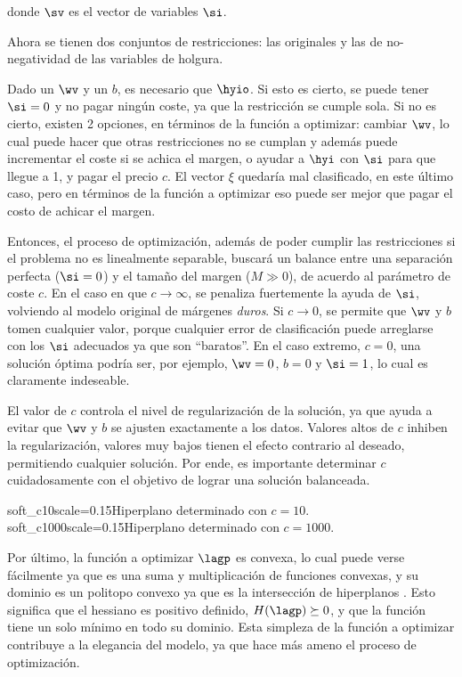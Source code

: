 donde $\sv$ es el vector de variables $\si$.

Ahora se tienen dos conjuntos de restricciones: las originales y las de no-negatividad de las variables de holgura.

Dado un $\wv$ y un $b$, es necesario que $\hyio$. Si esto es cierto, se puede tener $\si=0$ y no pagar ningún coste, ya que la restricción se cumple sola. Si no es cierto, existen 2 opciones, en términos de la función a optimizar:  cambiar $\wv$, lo cual puede hacer que otras restricciones no se cumplan y además puede incrementar el coste si se achica el margen, o ayudar a $\hyi$ con $\si$ para que llegue a 1, y pagar el precio $c$. El vector $\xi$ quedaría mal clasificado, en este último caso, pero en términos de la función a optimizar eso puede ser mejor que pagar el costo de achicar el margen. 

Entonces, el proceso de optimización, además de poder cumplir las restricciones si el problema no es linealmente separable, buscará un balance entre una separación perfecta ($\si=0$) y el tamaño del margen ($M \gg 0$), de acuerdo al parámetro de coste $c$. En el caso en que $c \rightarrow \infty$, se penaliza fuertemente la ayuda de $\si$, volviendo al modelo original de márgenes \textit{duros}. Si $c \rightarrow 0$, se permite que $\wv$ y $b$ tomen cualquier valor, porque cualquier error de clasificación puede arreglarse con los $\si$ adecuados ya que son ``baratos''. En el caso extremo, $c=0$, una solución óptima podría ser, por ejemplo, $\wv=0$, $b=0$ y $\si=1$, lo cual es claramente indeseable.




El valor de $c$ controla el nivel de regularización de la solución, ya que ayuda a evitar que $\wv$ y $b$ se ajusten exactamente a los datos. Valores altos de $c$ inhiben la regularización, valores muy bajos tienen el efecto contrario al deseado, permitiendo cualquier solución. Por ende, es importante determinar $c$ cuidadosamente con el objetivo de lograr una solución balanceada.


{soft_c10}{scale=0.15}{Hiperplano determinado con $c=10$. }
{soft_c1000}{scale=0.15}{Hiperplano determinado con $c=1000$. }


Por último, la función a optimizar $\lagp$ es convexa, lo cual puede verse fácilmente ya que es una suma y multiplicación de funciones convexas, y su dominio es un politopo convexo ya que es la intersección de hiperplanos \cite{boyd2004}. Esto significa que el hessiano es positivo definido, $H(\lagp) \succeq 0$, y que la función tiene un solo mínimo en todo su dominio. Esta simpleza de la función a optimizar contribuye a la elegancia del modelo, ya que hace más ameno el proceso de optimización.